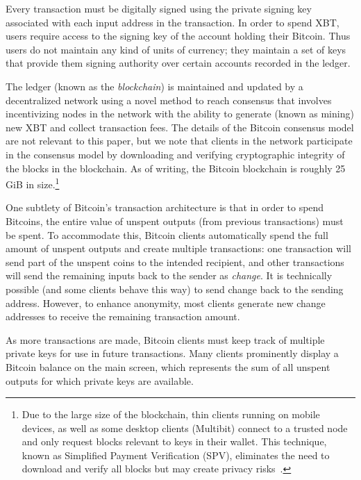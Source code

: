 Every transaction must be digitally signed using the private signing key associated with each input address in the transaction. In order to spend XBT, users require access to the signing key of the account holding their Bitcoin. Thus users do not maintain any kind of units of currency; they maintain a set of keys that provide them signing authority over certain accounts recorded in the ledger. 

The ledger (known as the \emph{blockchain}) is maintained and updated by a decentralized network using a novel method to reach consensus that involves incentivizing nodes in the network with the ability to generate (known as mining) new XBT and collect transaction fees. The details of the Bitcoin consensus model are not relevant to this paper, but we note that clients in the network participate in the consensus model by downloading and verifying cryptographic integrity of the blocks in the blockchain. As of writing, the Bitcoin blockchain is roughly 25 GiB in size.\footnote{Due to the large size of the blockchain, thin clients running on mobile devices, as well as some desktop clients (\eg Multibit) connect to a trusted node and only request blocks relevant to keys in their wallet. This technique, known as Simplified Payment Verification (SPV), eliminates the need to download and verify all blocks but may create privacy risks~\cite{SPVbugs}.}

One subtlety of Bitcoin's transaction architecture is that in order to spend Bitcoins, the entire value of unspent outputs (\ie from previous transactions) must be spent. To accommodate this, Bitcoin clients automatically spend the full amount of unspent outputs and create multiple transactions: one transaction will send part of the unspent coins to the intended recipient, and other transactions will send the remaining inputs back to the sender as \emph{change}. It is technically possible (and some clients behave this way) to send change back to the sending address. However, to enhance anonymity, most clients generate new change addresses to receive the remaining transaction amount. 

As more transactions are made, Bitcoin clients must keep track of multiple private keys for use in future transactions. Many clients prominently display a Bitcoin balance on the main screen, which represents the sum of all unspent outputs for which private keys are available. 

